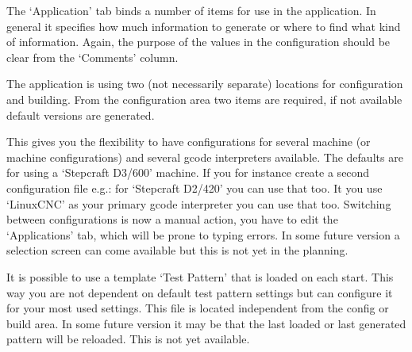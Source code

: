 The `Application' tab binds a number of items for use in the application. In general it specifies how much information to generate or where to find what kind of information.
Again, the purpose of the values in the configuration should be clear from the `Comments' column.

The application is using two (not necessarily separate) locations for configuration and building. From the configuration area two items are required, if not available
default versions are generated.

This gives you the flexibility to have configurations for several machine (or machine configurations) and several gcode interpreters available. The defaults are for
using a `Stepcraft D3/600' machine. If you for instance create a second configuration file e.g.: for `Stepcraft D2/420' you can use that too. It you use `LinuxCNC' as your
primary gcode interpreter you can use that too. Switching between configurations is now a manual action, you have to edit the `Applications' tab, which will be prone to
typing errors. In some future version a selection screen can come available but this is not yet in the planning.

It is possible to use a template `Test Pattern' that is loaded on each start. This way you are not dependent on default test pattern settings but can configure it for
your most used settings. This file is located independent from the config or build area. In some future version it may be that the last loaded or last generated pattern
will be reloaded. This is not yet available.

